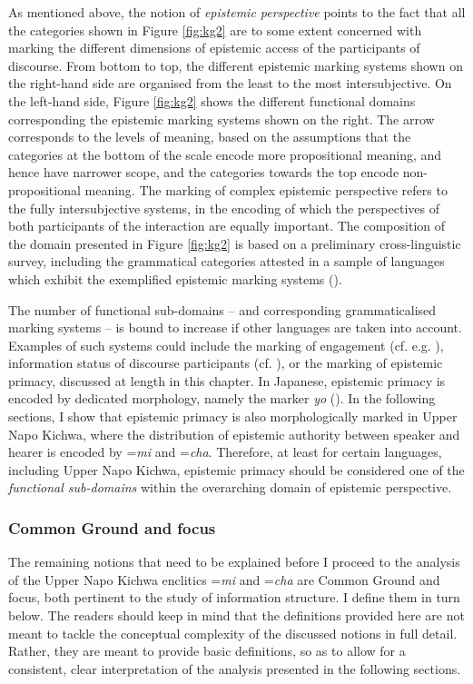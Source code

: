 \documentclass[output=paper]{langscibook}
\begin{document}
As mentioned above, the notion of \emph{epistemic perspective} points to the fact that all the categories shown in Figure \ref{fig:kg2} are to some extent concerned with marking the different dimensions of epistemic access of the participants of discourse. From bottom to top, the different epistemic marking systems shown on the right-hand side are organised from the least to the most intersubjective. On the left-hand side, Figure \ref{fig:kg2} shows the different functional domains corresponding the epistemic marking systems shown on the right. The arrow corresponds to the levels of meaning, based on the assumptions that the categories at the bottom of the scale encode more propositional meaning, and hence have narrower scope, and the categories towards the top encode non-propositional meaning. The marking of complex epistemic perspective refers to the fully intersubjective systems, in the encoding of which the perspectives of both participants of the interaction are equally important. The composition of the domain presented in Figure \ref{fig:kg2} is based on a preliminary cross-linguistic survey, including the grammatical categories attested in a sample of languages which exhibit the exemplified epistemic marking systems (\citealt{Bergqvist2017}). 

The number of functional sub-domains – and corresponding grammaticalised marking systems – is bound to increase if other languages are taken into account. Examples of such systems could include the marking of engagement (cf. e.g. \citealt{Landaburu2007}), information status of discourse participants (cf. \citealt{SanRoque2008}), or the marking of epistemic primacy, discussed at length in this chapter. In Japanese, epistemic primacy is encoded by dedicated morphology, namely the marker \textit{yo} (\citealt{Hayano2011}). In the following sections, I show that epistemic primacy is also morphologically marked in Upper Napo Kichwa, where the distribution of epistemic authority between speaker and hearer is encoded by =\textit{mi} and =\textit{cha}. Therefore, at least for certain languages, including Upper Napo Kichwa, epistemic primacy should be considered one of the \emph{functional sub-domains} within the overarching domain of epistemic perspective. 


\subsubsection{Common Ground and focus}\label{s:kg1-3-4}

The remaining notions that need to be explained before I proceed to the analysis of the Upper Napo Kichwa enclitics =\textit{mi} and =\textit{cha} are Common Ground and focus, both pertinent to the study of information structure. I define them in turn below. The readers should keep in mind that the definitions provided here are not meant to tackle the conceptual complexity of the discussed notions in full detail. Rather, they are meant to provide basic definitions, so as to allow for a consistent, clear interpretation of the analysis presented in the following sections.
\end{document}
